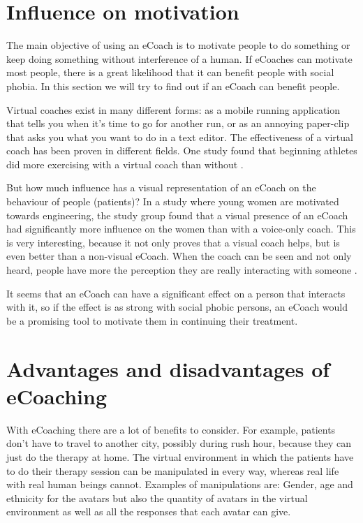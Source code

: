 \documentclass[twoside]{article}
\begin{document}
\begin{multicols}{2}

\section{Influence on motivation}
The main objective of using an eCoach is to motivate people to do something or keep doing something without interference of a human\cite{rosset2005}. If eCoaches can motivate most people, there is a great likelihood that it can benefit people with social phobia. In this section we will try to find out if an eCoach can benefit people.

Virtual coaches exist in many different forms: as a mobile running application that tells you when it's time to go for another run, or as an annoying paper-clip that asks you what you want to do in a text editor.  The effectiveness of a virtual coach has been proven in different fields. One study found that beginning athletes did more exercising with a virtual coach than without \cite{eyck2006effect}. 

But how much influence has a visual representation of an eCoach on the behaviour of people (patients)? In a study \cite{rosenberg2007importance} where young women are motivated towards engineering, the study group found that a visual presence of an eCoach had significantly more influence on the women than with a voice-only coach. This is very interesting, because it not only proves that a visual coach helps, but is even better than a non-visual eCoach. When the coach can be seen and not only heard, people have more the perception they are really interacting with someone \cite{baylor2009promoting}. 

It seems that an eCoach can have a significant effect on a person that interacts with it, so if the effect is as strong with social phobic persons, an eCoach would be a promising tool to motivate them in continuing their treatment.



\section{Advantages and disadvantages of eCoaching}
With eCoaching there are a lot of benefits to consider.  For example, patients don't have to travel to another city, possibly during rush hour, because they can just do the therapy at home. The virtual environment in which the patients have to do their therapy session can be manipulated in every way, whereas real life with real human beings cannot. Examples of manipulations are: Gender, age and ethnicity for the avatars but also the quantity of avatars in the virtual environment as well as all the responses that each avatar can give.


\end{multicols}
\end{document}
